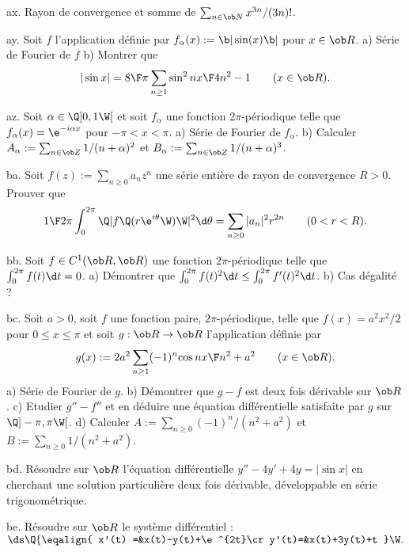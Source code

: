 \exo [Level=2,Fight=0,Learn=0,Field=\SériesEntières,Type=\Exercices,Origin=] ax. 
Rayon de convergence et somme de $\sum_{n\in\ob N}x^{3n}/(3n)!$. 

\exo [Level=2,Fight=0,Learn=0,Field=\SériesDeFourier,Type=\Exercices,Origin=] ay. 
Soit $f$ l'application 
définie par $f_\alpha(x):=\b|\sin (x)\b|$ pour $x\in\ob R$. \pn
a) Série de Fourier de $f$ \pn
b) Montrer que 
$$
|\sin x|={8\F\pi}\sum_{n\ge1}{\sin^2nx\F4n^2-1}\qquad(x\in\ob R).
$$

\exo [Level=2,Fight=1,Learn=0,Field=\SériesDeFourier,Type=\Exercices,Origin=] az. 
Soit $\alpha\in\Q]0,1\W[$ et soit $f_\alpha$ une fonction 
$2\pi$-périodique telle que $f_\alpha(x)=\e^{-i\alpha x}$ pour $-\pi<x<\pi$. \pn
a) Série de Fourier de $f_\alpha$. \pn
b) Calculer $A_\alpha:=\sum_{n\in\ob Z}1/(n+\alpha)^2$ et $B_\alpha:=\sum_{n\in\ob Z}1/(n+\alpha)^3$.

\exo [Level=2,Fight=1,Learn=0,Field=\SériesEntières,Type=\Exercices,Origin=] ba. 
Soit $f(z):=\sum_{n\ge0}a_nz^n$ une série entière de rayon de convergence $R>0$. Prouver que 
$$
{1\F2\pi}\int_0^{2\pi}\Q|f\Q(r\e^{i\theta}\W)\W|^2\d\theta=\sum_{n\ge0}|a_n|^2r^{2n}\qquad(0<r<R).
$$

\exo [Level=2,Fight=1,Learn=1,Field=\SériesDeFourier,Type=\Exercices,Origin=] bb. 
Soit $f\in\sc C^1(\ob R,\ob R)$ une fonction $2\pi$-périodique 
telle que $\int_0^{2\pi}f(t)\d t=0$. \pn
a) Démontrer que $\int_0^{2\pi}f(t)^2\d t\le \int_0^{2\pi}f'(t)^2\d t$. \pn
b) Cas dégalité ?

\exo [Level=2,Fight=2,Learn=1,Field=\SériesDeFonctions,Type=\Exercices,Origin=] bc. 
Soit $a>0$, soit $f$ une fonction paire, $2\pi$-périodique, telle que $f(x)=a^2x^2/2$ pour $0\le x\le \pi$ 
et soit $g:\ob R\to\ob R$ l'application définie par 
$$
g(x):=2a^2\sum_{n\ge1}(-1)^n{\cos nx\F n^2+a^2}\qquad(x\in\ob R).
$$ 
a) Série de Fourier de $g$. \pn
b) Démontrer que $g-f$ est deux fois dérivable sur $\ob R$. \pn
c) Etudier $g''-f''$ et en déduire une équation différentielle 
satisfaite par $g$ sur $\Q]-\pi,\pi\W[$. \pn
d) Calculer $A:=\sum_{n\ge0}(-1)^n/(n^2+a^2)$ et $B:=\sum_{n\ge0}1/(n^2+a^2)$. 

\exo [Level=2,Fight=1,Learn=1,Field=\SériesDeFourier,Type=\Exercices,Origin=,Indication=Utiliser le résultat a) de l'exercice \eqrefn{labelexoPTay}.] bd. 
Résoudre sur $\ob R$ l'équation différentielle $y''-4y'+4y=|\sin x|$ 
en cherchant une solution particulière deux fois dérivable, 
développable en série trigonométrique. 


\exo [Level=2,Fight=1,Learn=0,Field=\SystèmesDifférentiels,Type=\Exercices,Origin=] be. 
Résoudre sur $\ob R$ le système différentiel : 
$\ds \Q\{\eqalign{
x'(t)
=&x(t)-y(t)+\e^{2t}\cr
y'(t)=&x(t)+3y(t)+t
}\W.
$

